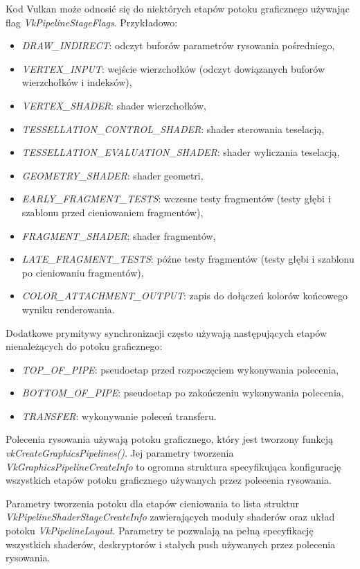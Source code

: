 Kod Vulkan może odnosić się do niektórych etapów potoku graficznego używając flag \textit{VkPipelineStageFlags}.
Przykładowo:
\begin{itemize}
	\item \textit{DRAW\_INDIRECT}: odczyt buforów parametrów rysowania pośredniego,
	\item \textit{VERTEX\_INPUT}: wejście wierzchołków (odczyt dowiązanych buforów wierzchołków i indeksów),
	\item \textit{VERTEX\_SHADER}: shader wierzchołków,
	\item \textit{TESSELLATION\_CONTROL\_SHADER}: shader sterowania teselacją,
	\item \textit{TESSELLATION\_EVALUATION\_SHADER}: shader wyliczania teselacją,
	\item \textit{GEOMETRY\_SHADER}: shader geometri,
	\item \textit{EARLY\_FRAGMENT\_TESTS}: wczesne testy fragmentów (testy głębi i szablonu przed cieniowaniem fragmentów),
	\item \textit{FRAGMENT\_SHADER}: shader fragmentów,
	\item \textit{LATE\_FRAGMENT\_TESTS}: późne testy fragmentów (testy głębi i szablonu po cieniowaniu fragmentów),
	\item \textit{COLOR\_ATTACHMENT\_OUTPUT}: zapis do dołączeń kolorów końcowego wyniku renderowania.
\end{itemize}
Dodatkowe prymitywy synchronizacji często używają następujących etapów nienależących do potoku graficznego:
\begin{itemize}
	\item \textit{TOP\_OF\_PIPE}: pseudoetap przed rozpoczęciem wykonywania polecenia,
	\item \textit{BOTTOM\_OF\_PIPE}: pseudoetap po zakończeniu wykonywania polecenia,
	\item \textit{TRANSFER}: wykonywanie poleceń transferu.
\end{itemize}

Polecenia rysowania używają potoku graficznego, który jest tworzony funkcją \textit{vkCreateGraphicsPipelines()}. Jej parametry tworzenia \textit{VkGraphicsPipelineCreateInfo} to ogromna struktura specyfikująca konfigurację wszystkich etapów potoku graficznego używanych przez polecenia rysowania.

Parametry tworzenia potoku dla etapów cieniowania to lista struktur \textit{VkPipelineShaderStageCreateInfo} zawierających moduły shaderów oraz układ potoku \textit{VkPipelineLayout}. Parametry te pozwalają na pełną specyfikację wszystkich shaderów, deskryptorów i stałych push używanych przez polecenia rysowania.

